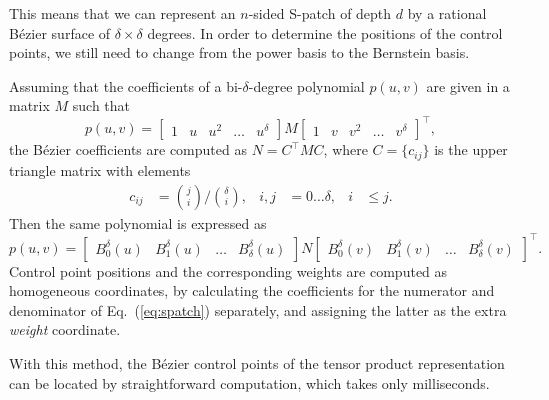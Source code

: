 \documentclass[9pt,academicons]{article}
\begin{document}
This means that we can represent an $n$-sided S-patch of depth $d$ by a rational B\'ezier
surface of $\delta\times\delta$ degrees. In order to determine the positions of the control points,
we still need to change from the power basis to the Bernstein basis.

Assuming that the coefficients of a bi-$\delta$-degree polynomial $p(u,v)$
are given in a matrix $M$ such that
\begin{equation}
  \label{eq:power}
  p(u,v)=
  \left[\begin{array}{ccccc}1&u&u^2&\dots&u^\delta\end{array}\right]
  M
  \left[\begin{array}{ccccc}1&v&v^2&\dots&v^\delta\end{array}\right]^\top,
\end{equation}
the B\'ezier coefficients are computed as $N=C^\top MC$, where $C=\{c_{ij}\}$ is
the upper triangle matrix with elements
\begin{equation}
  \begin{aligned}
    c_{ij}&={j\choose i}\bigg/{\delta\choose i}, & i,j&=0\dots\delta, & i&\leq j.
  \end{aligned}
\end{equation}
Then the same polynomial is expressed as
\begin{equation}
  \label{eq:bernstein}
  p(u,v)=
  \left[\begin{array}{cccc}B_0^\delta(u)&B_1^\delta(u)&\dots&B_\delta^\delta(u)\end{array}\right]
  N
  \left[\begin{array}{cccc}B_0^\delta(v)&B_1^\delta(v)&\dots&B_\delta^\delta(v)\end{array}\right]^\top.
\end{equation}
Control point positions and the corresponding weights are computed as homogeneous coordinates,
by calculating the coefficients for the numerator and denominator of Eq.~(\ref{eq:spatch})
separately, and assigning the latter as the extra \emph{weight} coordinate.

With this method, the B\'ezier control points of the tensor product representation
can be located by straightforward computation, which takes only milliseconds.
\end{document}
